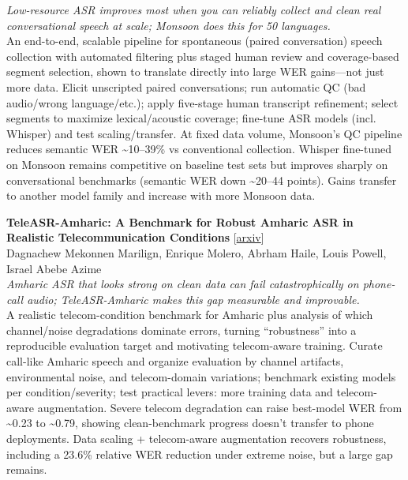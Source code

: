 \documentclass[12pt,letterpaper]{article}
\begin{document}
{\small\textit{Low-resource ASR improves most when you can reliably collect and clean real conversational speech at scale; Monsoon does this for 50 languages.}}\\[1pt]
{\footnotesize An end-to-end, scalable pipeline for spontaneous (paired conversation) speech collection with automated filtering plus staged human review and coverage-based segment selection, shown to translate directly into large WER gains---not just more data. Elicit unscripted paired conversations; run automatic QC (bad audio/wrong language/etc.); apply five-stage human transcript refinement; select segments to maximize lexical/acoustic coverage; fine-tune ASR models (incl. Whisper) and test scaling/transfer. At fixed data volume, Monsoon's QC pipeline reduces semantic WER \textasciitilde{}10--39\% vs conventional collection. Whisper fine-tuned on Monsoon remains competitive on baseline test sets but improves sharply on conversational benchmarks (semantic WER down \textasciitilde{}20--44 points). Gains transfer to another model family and increase with more Monsoon data.}

\medskip

{\small\textbf{TeleASR-Amharic: A Benchmark for Robust Amharic ASR in Realistic Telecommunication Conditions}} {\scriptsize[\href{https://arxiv.org/abs/2610.26448}{arxiv}]}\\
{\scriptsize Dagnachew Mekonnen Marilign, Enrique Molero, Abrham Haile, Louis Powell, Israel Abebe Azime}\\

{\small\textit{Amharic ASR that looks strong on clean data can fail catastrophically on phone-call audio; TeleASR-Amharic makes this gap measurable and improvable.}}\\[1pt]
{\footnotesize A realistic telecom-condition benchmark for Amharic plus analysis of which channel/noise degradations dominate errors, turning ``robustness'' into a reproducible evaluation target and motivating telecom-aware training. Curate call-like Amharic speech and organize evaluation by channel artifacts, environmental noise, and telecom-domain variations; benchmark existing models per condition/severity; test practical levers: more training data and telecom-aware augmentation. Severe telecom degradation can raise best-model WER from \textasciitilde{}0.23 to \textasciitilde{}0.79, showing clean-benchmark progress doesn't transfer to phone deployments. Data scaling + telecom-aware augmentation recovers robustness, including a 23.6\% relative WER reduction under extreme noise, but a large gap remains.}
\end{document}

